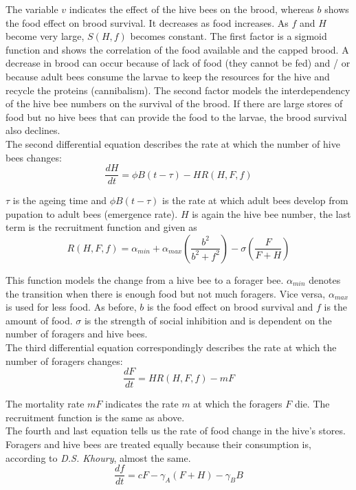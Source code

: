 	The variable $v$ indicates the effect of the hive bees on the brood, whereas $b$ shows the food effect on brood survival. It decreases as food increases. As $f$ and $H$ become very large, $S(H,f)$ becomes constant. The first factor is a sigmoid function and shows the correlation of the food available and the capped brood. A decrease in brood can occur because of lack of food (they cannot be fed) and / or because adult bees consume the larvae to keep the resources for the hive and recycle the proteins (cannibalism). The second factor models the interdependency of the hive bee numbers on the survival of the brood. If there are large stores of food but no hive bees that can provide the food to the larvae, the brood survival also declines.  
	\\
	The second differential equation describes the rate at which the number of hive bees changes:	
	\begin{equation}\label{eq:changeHiveBees}
		\frac{dH}{dt}=\phi B(t-\tau)-HR(H,F,f)
	\end{equation}
	
	$\tau$ is the ageing time and $\phi B(t-\tau)$ is the rate at which adult bees develop from pupation to adult bees (emergence rate). $H$ is again the hive bee number, the last term is the recruitment function and given as		
		\begin{equation}\label{eq:recruitmentFunction}
			R(H,F,f) = \alpha_{min} + \alpha_{max}(\frac{b^2}{b^2+f^2})-\sigma(\frac{F}{F+H})
		\end{equation}
				
	This function models the change from a hive bee to a forager bee. $\alpha_{min}$ denotes the transition when there is enough food but not much foragers. Vice versa, $\alpha_{max}$ is used for less food. As before, $b$ is the food effect on brood survival and $f$ is the amount of food. $\sigma$ is the strength of social inhibition and is dependent on the number of foragers and hive bees.\\
	The third differential equation correspondingly describes the rate at which the number of foragers changes:	
	\begin{equation}\label{eq:changeForagers}
		\frac{dF}{dt} = HR(H,F,f)-m F
	\end{equation}
	
	The mortality rate $mF$ indicates the rate $m$ at which the foragers $F$ die. The recruitment function is the same as above.\\	
	The fourth and last equation tells us the rate of food change in the hive's stores. Foragers and hive bees are treated equally because their consumption is, according to \textit{D.S. Khoury}, almost the same. 	
	\begin{equation}\label{eq:changeFoodStoreConst}
		\frac{df}{dt} = c F - \gamma_A (F+H) - \gamma_B B
	\end{equation}
	
